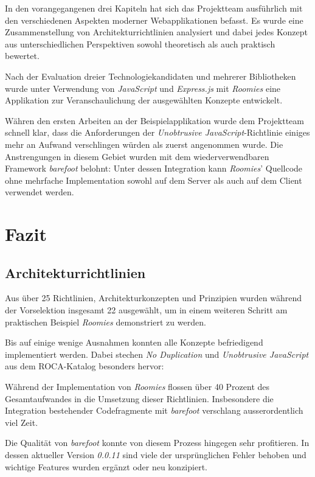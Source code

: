 In den vorangegangenen drei Kapiteln hat sich das Projektteam ausführlich mit den verschiedenen Aspekten moderner Webapplikationen befasst. Es wurde eine Zusammenstellung von Architekturrichtlinien analysiert und dabei jedes Konzept aus unterschiedlichen Perspektiven sowohl theoretisch als auch praktisch bewertet.

Nach der Evaluation dreier Technologiekandidaten und mehrerer Bibliotheken wurde unter Verwendung von \emph{JavaScript} und \emph{Express.js} mit \emph{Roomies} eine Applikation zur Veranschaulichung der ausgewählten Konzepte entwickelt.

Währen den ersten Arbeiten an der Beispielapplikation wurde dem Projektteam schnell klar, dass die Anforderungen der \emph{Unobtrusive JavaScript}-Richtlinie einiges mehr an Aufwand verschlingen würden als zuerst angenommen wurde. Die Anstrengungen in diesem Gebiet wurden mit dem wiederverwendbaren Framework \emph{barefoot} belohnt: Unter dessen Integration kann \emph{Roomies}' Quellcode ohne mehrfache Implementation sowohl auf dem Server als auch auf dem Client verwendet werden.


\section*{Fazit}


\subsection*{Architekturrichtlinien}

Aus über 25 Richtlinien, Architekturkonzepten und Prinzipien wurden während der Vorselektion insgesamt 22 ausgewählt, um in einem weiteren Schritt am praktischen Beispiel \emph{Roomies} demonstriert zu werden.

Bis auf einige wenige Ausnahmen konnten alle Konzepte befriedigend implementiert werden. Dabei stechen \emph{No Duplication} und \emph{Unobtrusive JavaScript} aus dem ROCA-Katalog besonders hervor:

Während der Implementation von \emph{Roomies} flossen über 40 Prozent des Gesamtaufwandes in die Umsetzung dieser Richtlinien. Insbesondere die Integration bestehender Codefragmente mit \emph{barefoot} verschlang ausserordentlich viel Zeit.

Die Qualität von \emph{barefoot} konnte von diesem Prozess hingegen sehr profitieren. In dessen aktueller Version \emph{0.0.11} sind viele der ursprünglichen Fehler behoben und wichtige Features wurden ergänzt oder neu konzipiert.

